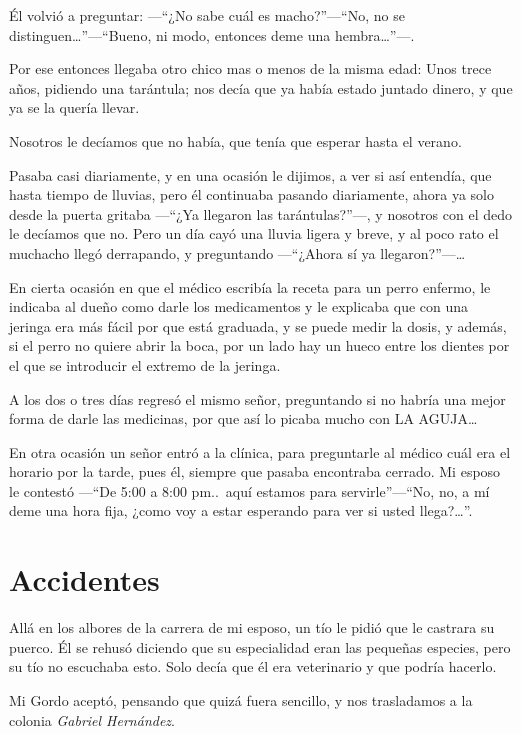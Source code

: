 \documentclass[letterpaper, 12pt]{book}
\begin{document}
Él volvió a preguntar: ---``¿No sabe cuál es macho?''---``No, no se distinguen\ldots''---``Bueno, ni modo, entonces deme una hembra\ldots''---.

Por ese entonces llegaba otro chico mas o menos de la misma edad: Unos trece años, pidiendo una tarántula; nos decía que ya había estado juntado dinero, y que ya se la quería llevar.

Nosotros le decíamos que no había, que tenía que esperar hasta el verano.

Pasaba casi diariamente, y en una ocasión le dijimos, a ver si así entendía, que hasta tiempo de lluvias, pero él continuaba pasando diariamente, ahora ya solo desde la puerta gritaba ---``¿Ya llegaron las tarántulas?''---, y nosotros con el dedo le decíamos que no. Pero un día cayó una lluvia ligera y breve, y al poco rato el muchacho llegó derrapando, y preguntando ---``¿Ahora sí ya llegaron?''---\ldots

En cierta ocasión en que el médico escribía la receta para un perro enfermo, le indicaba al dueño como darle los medicamentos y le explicaba que con una jeringa era más fácil por que está graduada, y se puede medir la dosis, y además, si el perro no quiere abrir la boca, por un lado hay un hueco entre los dientes por el que se introducir el extremo de la jeringa.

A los dos o tres días regresó el mismo señor, preguntando si no habría una mejor forma de darle las medicinas, por que así lo picaba mucho con LA AGUJA\ldots

En otra ocasión un señor entró a la clínica, para preguntarle al médico cuál era el horario por la tarde, pues él, siempre que pasaba encontraba cerrado. Mi esposo le contestó ---``De 5:00 a 8:00 pm..\ aquí estamos para servirle''---``No, no, a mí deme una hora fija, ¿como voy a estar esperando para ver si usted llega?\ldots''.

\chapter{Accidentes}

Allá en los albores de la carrera de mi esposo, un tío le pidió que le castrara su puerco. Él se rehusó diciendo que su especialidad eran las pequeñas especies, pero su tío no escuchaba esto. Solo decía que él era veterinario y que podría hacerlo.

Mi Gordo aceptó, pensando que quizá fuera sencillo, y nos trasladamos a la colonia \textit{Gabriel Hernández}. 
\end{document}
